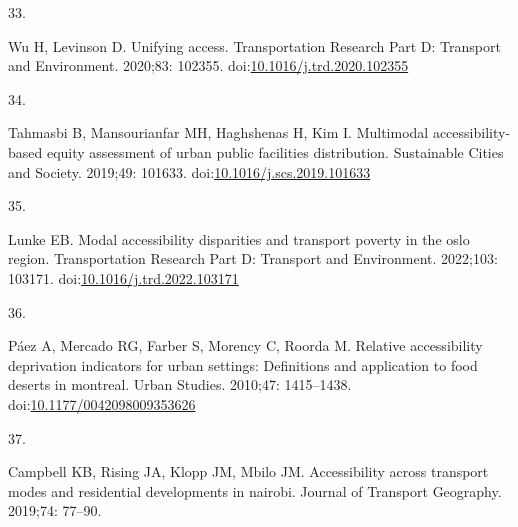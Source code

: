\documentclass[10pt,letterpaper]{article}
\newlength{\cslhangindent}
\newlength{\csllabelwidth}
\newlength{\cslentryspacingunit} %
\newenvironment{CSLReferences}[2] %
 {%
  \setlength{\parindent}{0pt}
  \ifodd #1
  \let\oldpar\par
  \def\par{\hangindent=\cslhangindent\oldpar}
  \fi
  \setlength{\parskip}{#2\cslentryspacingunit}
 }%
 {}
\newcommand{\CSLLeftMargin}[1]{\parbox[t]{\csllabelwidth}{#1}}
\newcommand{\CSLRightInline}[1]{\parbox[t]{\linewidth - \csllabelwidth}{#1}\break}
\providecommand{\DIFaddbegin}{} %
\providecommand{\DIFaddend}{} %
\providecommand{\DIFdelbegin}{} %
\providecommand{\DIFdelend}{} %
\newcommand{\DIFscaledelfig}{0.5}
\newlength{\DIFdelgraphicswidth} %
\newlength{\DIFdelgraphicsheight} %
\newcommand{\DIFaddincludegraphics}[2][]{{\color{blue}\fbox{\DIFOincludegraphics[#1]{#2}}}} %
\newcommand{\DIFdelincludegraphics}[2][]{%
\sbox{\DIFdelgraphicsbox}{\DIFOincludegraphics[#1]{#2}}%
\settoboxwidth{\DIFdelgraphicswidth}{\DIFdelgraphicsbox} %
\settoboxtotalheight{\DIFdelgraphicsheight}{\DIFdelgraphicsbox} %
\scalebox{\DIFscaledelfig}{%
\parbox[b]{\DIFdelgraphicswidth}{\usebox{\DIFdelgraphicsbox}\\[-\baselineskip] \rule{\DIFdelgraphicswidth}{0em}}\llap{\resizebox{\DIFdelgraphicswidth}{\DIFdelgraphicsheight}{%
\setlength{\unitlength}{\DIFdelgraphicswidth}%
\begin{picture}(1,1)%
\thicklines\linethickness{2pt} %
{\color[rgb]{1,0,0}\put(0,0){\framebox(1,1){}}}%
{\color[rgb]{1,0,0}\put(0,0){\line( 1,1){1}}}%
{\color[rgb]{1,0,0}\put(0,1){\line(1,-1){1}}}%
\end{picture}%
}\hspace*{3pt}}} %
} %
\DeclareRobustCommand{\DIFaddbegin}{\DIFOaddbegin \let\includegraphics\DIFaddincludegraphics} %
\DeclareRobustCommand{\DIFaddend}{\DIFOaddend \let\includegraphics\DIFOincludegraphics} %
\DeclareRobustCommand{\DIFdelbegin}{\DIFOdelbegin \let\includegraphics\DIFdelincludegraphics} %
\DeclareRobustCommand{\DIFdelend}{\DIFOaddend \let\includegraphics\DIFOincludegraphics} %
\begin{document}
\begin{CSLReferences}{0}{0}
\leavevmode{}%
\DIFdelbegin %
\DIFdelend \DIFaddbegin \CSLLeftMargin{33. }\DIFaddend %
\CSLRightInline{Wu H, Levinson D. Unifying access. Transportation
Research Part D: Transport and Environment. 2020;83: 102355.
doi:\href{https://doi.org/10.1016/j.trd.2020.102355}{10.1016/j.trd.2020.102355}}

\leavevmode{}%
\DIFdelbegin %
\DIFdelend \DIFaddbegin \CSLLeftMargin{34. }\DIFaddend %
\CSLRightInline{Tahmasbi B, Mansourianfar MH, Haghshenas H, Kim I.
Multimodal accessibility-based equity assessment of urban public
facilities distribution. Sustainable Cities and Society. 2019;49:
101633.
doi:\href{https://doi.org/10.1016/j.scs.2019.101633}{10.1016/j.scs.2019.101633}}

\leavevmode{}%
\DIFdelbegin %
\DIFdelend \DIFaddbegin \CSLLeftMargin{35. }\DIFaddend %
\CSLRightInline{Lunke EB. Modal accessibility disparities and transport
poverty in the oslo region. Transportation Research Part D: Transport
and Environment. 2022;103: 103171.
doi:\href{https://doi.org/10.1016/j.trd.2022.103171}{10.1016/j.trd.2022.103171}}

\leavevmode{}%
\DIFdelbegin %
\DIFdelend \DIFaddbegin \CSLLeftMargin{36. }\DIFaddend %
\DIFdelbegin %
\DIFdelend \DIFaddbegin \CSLRightInline{Páez A, Mercado RG, Farber S, Morency C, Roorda M.
Relative accessibility deprivation indicators for urban settings:
Definitions and application to food deserts in montreal. Urban Studies.
2010;47: 1415--1438.
doi:\href{https://doi.org/10.1177/0042098009353626}{10.1177/0042098009353626}}
\DIFaddend 

\leavevmode{}%
\DIFdelbegin %
\DIFdelend \DIFaddbegin \CSLLeftMargin{37. }\DIFaddend %
\CSLRightInline{Campbell KB, Rising JA, Klopp JM, Mbilo JM.
Accessibility across transport modes and residential developments in
nairobi. Journal of Transport Geography. 2019;74: 77--90. }


\end{CSLReferences}
\end{document}
